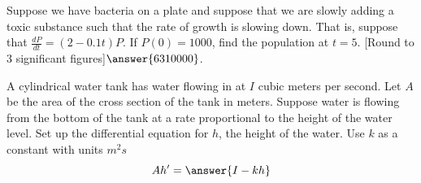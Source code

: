 \documentclass{ximera}
\begin{document}

\begin{exercise}%
    Suppose we have bacteria on a plate and suppose that we are slowly adding a toxic substance such that the rate of growth is slowing down.  That is, suppose that $\frac{dP}{dt} = (2 - 0.1t)P$.  If $P(0) = 1000$, find the population at $t=5$. [Round to 3 significant figures]$\answer{6310000}$.
\end{exercise}

\begin{exercise}%
    A cylindrical water tank has water flowing in at $I$ cubic meters per second. Let $A$ be the area of the cross section of the tank in meters. Suppose water is flowing from the bottom of the tank at a rate proportional to the height of the water level.  Set up the differential equation for $h$, the height of the water. Use $k$ as a constant with units $\unit{m^2}{s}$
    \[
        Ah' = \answer{I - kh}
    \]
\end{exercise}
\end{document}
